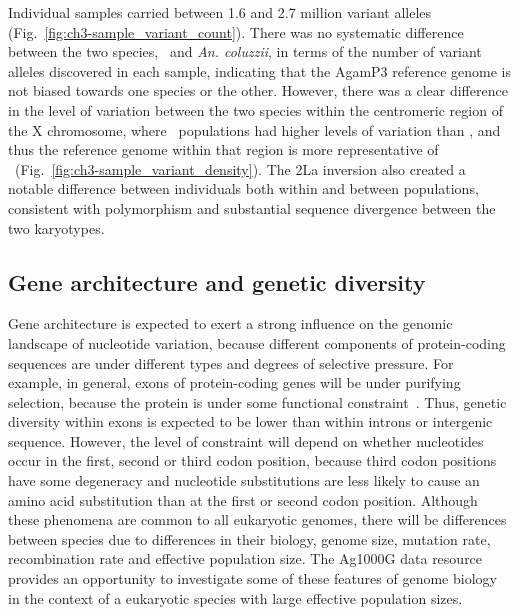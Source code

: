 \begin{refsection}
Individual samples carried between 1.6 and 2.7 million variant alleles (Fig.~\ref{fig:ch3-sample_variant_count}).
%
There was no systematic difference between the two species, \agam\ and \textit{An. coluzzii}, in terms of the number of variant alleles discovered in each sample, indicating that the AgamP3 reference genome is not biased towards one species or the other.
%
However, there was a clear difference in the level of variation between the two species within the centromeric region of the X chromosome, where \agam\ populations had higher levels of variation than \acol, and thus the reference genome within that region is more representative of \acol\ (Fig.~\ref{fig:ch3-sample_variant_density}).
%
The 2La inversion also created a notable difference between individuals both within and between populations, consistent with polymorphism and substantial sequence divergence between the two karyotypes.


\subsection{Gene architecture and genetic diversity}\label{subsec:gene-architecture-and-genetic-diversity}


%
Gene architecture is expected to exert a strong influence on the genomic landscape of nucleotide variation, because different components of protein-coding sequences are under different types and degrees of selective pressure.
%
For example, in general, exons of protein-coding genes will be under purifying selection, because the protein is under some functional constraint~\parencite{Ohta1996}.
%
Thus, genetic diversity within exons is expected to be lower than within introns or intergenic sequence.
%
However, the level of constraint will depend on whether nucleotides occur in the first, second or third codon position, because third codon positions have some degeneracy and nucleotide substitutions are less likely to cause an amino acid substitution than at the first or second codon position.
%
Although these phenomena are common to all eukaryotic genomes, there will be differences between species due to differences in their biology, genome size, mutation rate, recombination rate and effective population size.
%
The Ag1000G data resource provides an opportunity to investigate some of these features of genome biology in the context of a eukaryotic species with large effective population sizes.



\end{refsection}
